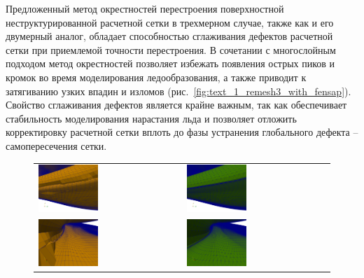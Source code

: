 \documentclass[a4paper,14pt]{extarticle}                     %
\theoremstyle{plain}                                         %
\begin{document}
Предложенный метод окрестностей перестроения поверхностной неструктурированной расчетной сетки в трехмерном случае, также как и его двумерный аналог, обладает способностью сглаживания дефектов расчетной сетки при приемлемой точности перестроения.
В сочетании с многослойным подходом метод окрестностей позволяет избежать появления острых пиков и кромок во время моделирования ледообразования, а также приводит к затягиванию узких впадин и изломов (рис.~\ref{fig:text_1_remesh3_with_fensap}).
Свойство сглаживания дефектов является крайне важным, так как обеспечивает стабильность моделирования нарастания льда и позволяет отложить корректировку расчетной сетки вплоть до фазы устранения глобального дефекта -- самопересечения сетки.

\begin{figure}[!ht]
\centering
\begin{tabular}{ll}
\includegraphics[width=0.43\textwidth]{fig/3dr_fens1.png}
&
\includegraphics[width=0.43\textwidth]{fig/3dr_crys1.png} \\
\includegraphics[width=0.43\textwidth]{fig/3dr_fens2.png}
&
\includegraphics[width=0.43\textwidth]{fig/3dr_crys2.png}

\end{tabular}
\end{figure}
\end{document}
